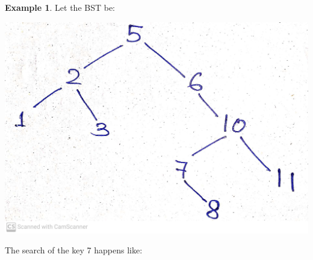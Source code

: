\documentclass[10pt, a4paper]{extarticle}
\theoremstyle{definition}
\newtheorem{eg}{Example}
\begin{document}
\begin{eg}
	Let the BST be:
	\begin{center}
		\includegraphics[scale=0.07]{bst1.jpg}\\
	\end{center}
	The search of the key 7 happens like:
	\begin{center}

\end{center}
\end{eg}
\end{document}
